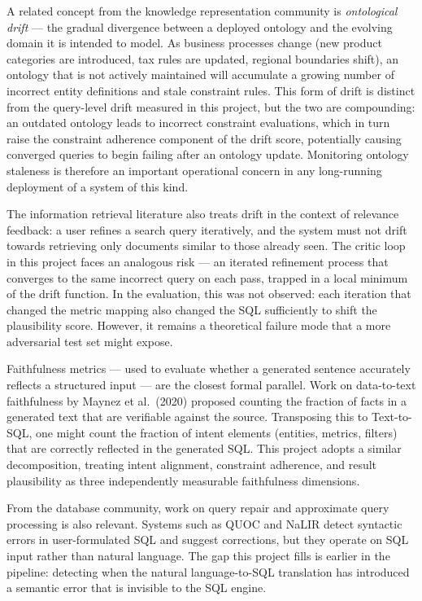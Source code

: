 \documentclass[12pt,a4paper]{report}
\begin{document}
A related concept from the knowledge representation community is \textit{ontological drift} — the gradual divergence between a deployed ontology and the evolving domain it is intended to model. As business processes change (new product categories are introduced, tax rules are updated, regional boundaries shift), an ontology that is not actively maintained will accumulate a growing number of incorrect entity definitions and stale constraint rules. This form of drift is distinct from the query-level drift measured in this project, but the two are compounding: an outdated ontology leads to incorrect constraint evaluations, which in turn raise the constraint adherence component of the drift score, potentially causing converged queries to begin failing after an ontology update. Monitoring ontology staleness is therefore an important operational concern in any long-running deployment of a system of this kind.

The information retrieval literature also treats drift in the context of relevance feedback: a user refines a search query iteratively, and the system must not drift towards retrieving only documents similar to those already seen. The critic loop in this project faces an analogous risk — an iterated refinement process that converges to the same incorrect query on each pass, trapped in a local minimum of the drift function. In the evaluation, this was not observed: each iteration that changed the metric mapping also changed the SQL sufficiently to shift the plausibility score. However, it remains a theoretical failure mode that a more adversarial test set might expose.

Faithfulness metrics — used to evaluate whether a generated sentence accurately reflects a structured input — are the closest formal parallel. Work on data-to-text faithfulness by Maynez et al.\ (2020) proposed counting the fraction of facts in a generated text that are verifiable against the source. Transposing this to Text-to-SQL, one might count the fraction of intent elements (entities, metrics, filters) that are correctly reflected in the generated \ac{SQL}. This project adopts a similar decomposition, treating intent alignment, constraint adherence, and result plausibility as three independently measurable faithfulness dimensions.

From the database community, work on query repair and approximate query processing is also relevant. Systems such as QUOC and NaLIR detect syntactic errors in user-formulated \ac{SQL} and suggest corrections, but they operate on \ac{SQL} input rather than natural language. The gap this project fills is earlier in the pipeline: detecting when the natural language-to-SQL translation has introduced a semantic error that is invisible to the \ac{SQL} engine.
\end{document}
